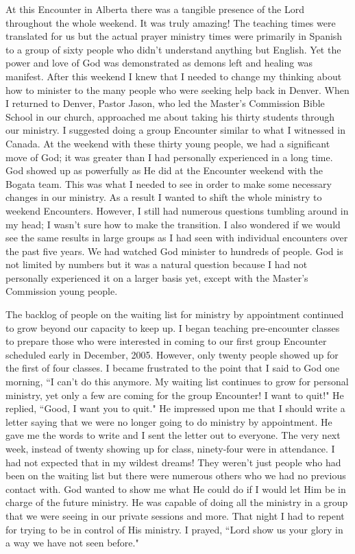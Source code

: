 \documentclass[oneside,12pt]{book}
\begin{document}
At this Encounter in Alberta there was a tangible presence of the Lord throughout the whole weekend. It was truly amazing! The teaching times were translated for us but the actual prayer ministry times were primarily in Spanish to a group of sixty people who didn't understand anything but English. Yet the power and love of God was demonstrated as demons left and healing was manifest. After this weekend I knew that I needed to change my thinking about how to minister to the many people who were seeking help back in Denver. When I returned to Denver, Pastor Jason, who led the Master's Commission Bible School in our church, approached me about taking his thirty students through our ministry.  I suggested doing a group Encounter similar to what I witnessed in Canada. At the weekend with these thirty young people, we had a significant move of God; it was greater than I had personally experienced in a long time. God showed up as powerfully as He did at the Encounter weekend with the Bogata team. This was what I needed to see in order to make some necessary changes in our ministry. As a result I wanted to shift the whole ministry to weekend Encounters. However, I still had numerous questions tumbling around in my head; I wasn't sure how to make the transition. I also wondered if we would see the same results in large groups as I had seen with individual encounters over the past five years. We had watched God minister to hundreds of people. God is not limited by numbers but it was a natural question because I had not personally experienced it on a larger basis yet, except with the Master's Commission young people.  

The backlog of people on the waiting list for ministry by appointment continued to grow beyond our capacity to keep up. I began teaching pre-encounter classes to prepare those who were interested in coming to our first group Encounter scheduled early in December, 2005. However, only twenty people showed up for the first of four classes. I became frustrated to the point that I said to God one morning, ``I can't do this anymore. My waiting list continues to grow for personal ministry, yet only a few are coming for the group Encounter! I want to quit!" He replied, ``Good, I want you to quit." He impressed upon me that I should write a letter saying that we were no longer going to do ministry by appointment.  He gave me the words to write and I sent the letter out to everyone. The very next week, instead of twenty showing up for class, ninety-four were in attendance. I had not expected that in my wildest dreams! They weren't just people who had been on the waiting list but there were numerous others who we had no previous contact with. God wanted to show me what He could do if I would let Him be in charge of the future ministry. He was capable of doing all the ministry in a group that we were seeing in our private sessions and more. That night I had to repent for trying to be in control of His ministry. I prayed, ``Lord show us your glory in a way we have not seen before." 
\end{document}
